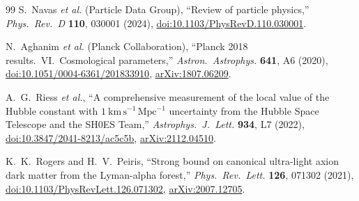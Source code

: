 \documentclass[reprint,amsmath,amssymb,aps,prd,longbibliography,floatfix]{revtex4-2}
\begin{document}
\begin{thebibliography}{99}
S.~Navas \emph{et al.} (Particle Data Group),
``Review of particle physics,''
\emph{Phys.~Rev.~D} \textbf{110}, 030001 (2024),
\href{https://doi.org/10.1103/PhysRevD.110.030001}{doi:10.1103/PhysRevD.110.030001}.

N.~Aghanim \emph{et al.} (Planck Collaboration),
``Planck 2018 results.~VI.~Cosmological parameters,''
\emph{Astron.~Astrophys.} \textbf{641}, A6 (2020),
\href{https://doi.org/10.1051/0004-6361/201833910}{doi:10.1051/0004-6361/201833910},
\href{https://arxiv.org/abs/1807.06209}{arXiv:1807.06209}.

A.~G.~Riess \emph{et al.},
``A comprehensive measurement of the local value of the Hubble constant
with $1~\mathrm{km\,s^{-1}\,Mpc^{-1}}$ uncertainty from the Hubble Space
Telescope and the SH0ES Team,''
\emph{Astrophys.~J.~Lett.} \textbf{934}, L7 (2022),
\href{https://doi.org/10.3847/2041-8213/ac5c5b}{doi:10.3847/2041-8213/ac5c5b},
\href{https://arxiv.org/abs/2112.04510}{arXiv:2112.04510}.

K.~K.~Rogers and H.~V.~Peiris,
``Strong bound on canonical ultra-light axion dark matter from the
Lyman-alpha forest,''
\emph{Phys.~Rev.~Lett.} \textbf{126}, 071302 (2021),
\href{https://doi.org/10.1103/PhysRevLett.126.071302}{doi:10.1103/PhysRevLett.126.071302},
\href{https://arxiv.org/abs/2007.12705}{arXiv:2007.12705}.

\end{thebibliography}
\end{document}
